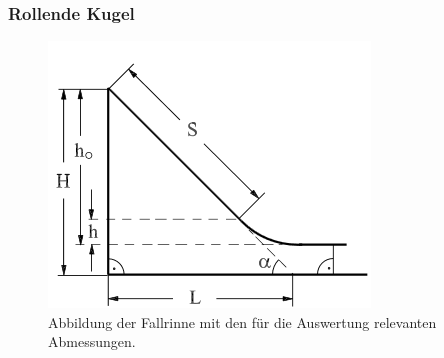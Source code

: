 \subsubsection*{Rollende Kugel}

\begin{figure}[h]
	\centering
	\includegraphics[width=0.7\linewidth]{res/FallrinneSkizze}
	\caption{Abbildung der Fallrinne mit den für die Auswertung relevanten Abmessungen\cite{anleitung-ws2017}.}
	\label{fig:rinneskizze}
\end{figure}

